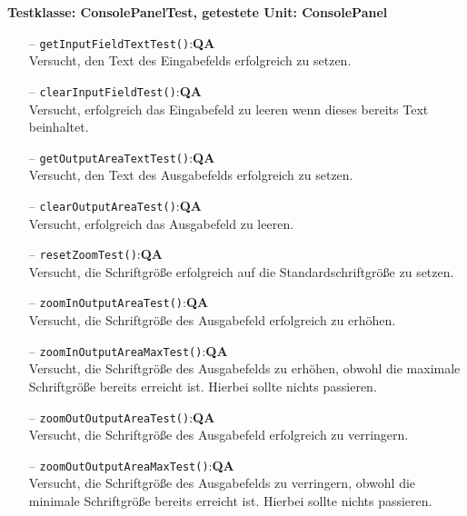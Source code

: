 \documentclass[parskip=full,11pt,twoside]{scrartcl}
\def\qa{\hfill\textbf{QA}}
\begin{document}
\textbf{Testklasse: ConsolePanelTest, getestete Unit: ConsolePanel}
\begin{itemize}
	\item[--] \texttt{getInputFieldTextTest()}:\qa\\
	Versucht, den Text des Eingabefelds erfolgreich zu setzen.
	\item[--] \texttt{clearInputFieldTest()}:\qa\\
	Versucht, erfolgreich das Eingabefeld zu leeren wenn dieses bereits Text beinhaltet.
	\item[--] \texttt{getOutputAreaTextTest()}:\qa\\
	Versucht, den Text des Ausgabefelds erfolgreich zu setzen.
	\item[--] \texttt{clearOutputAreaTest()}:\qa\\
	Versucht, erfolgreich das Ausgabefeld zu leeren.
	\item[--] \texttt{resetZoomTest()}:\qa\\
	Versucht, die Schriftgröße erfolgreich auf die Standardschriftgröße zu setzen.
	\item[--] \texttt{zoomInOutputAreaTest()}:\qa\\
	Versucht, die Schriftgröße des Ausgabefeld erfolgreich zu erhöhen.
	\item[--] \texttt{zoomInOutputAreaMaxTest()}:\qa\\
	Versucht, die Schriftgröße des Ausgabefelds zu erhöhen, obwohl die maximale Schriftgröße bereits erreicht ist. Hierbei sollte nichts passieren.
	\item[--] \texttt{zoomOutOutputAreaTest()}:\qa\\
	Versucht, die Schriftgröße des Ausgabefeld erfolgreich zu verringern.
	\item[--] \texttt{zoomOutOutputAreaMaxTest()}:\qa\\
	Versucht, die Schriftgröße des Ausgabefelds zu verringern, obwohl die minimale Schriftgröße bereits erreicht ist. Hierbei sollte nichts passieren.
\end{itemize}
\end{document}
